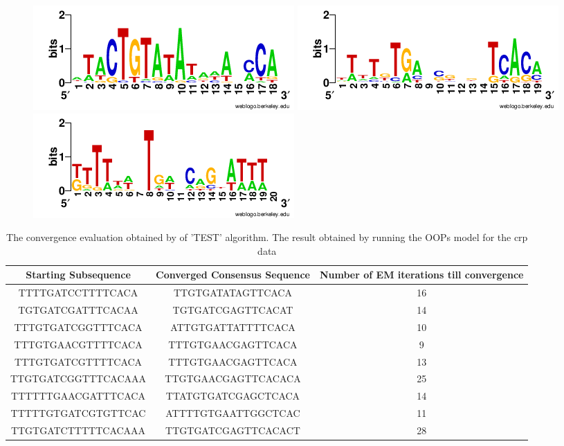\documentclass{article}
\begin{document}
\begin{table}
 \begin{figure}[H]
\centering
\includegraphics[scale=0.45]{crplex1.png}
\includegraphics[scale=0.45]{crplex2.png}
\includegraphics[scale=0.45]{crplex3.png}
\label{fig:svd}
\end{figure}
\end{table}




\begin{table}
\caption{The convergence evaluation obtained by  of 'TEST' algorithm. The result obtained by running the OOPs model for the crp data}
\centering
  \begin{tabular}{|c|c|c|}
    \textbf{Starting Subsequence}     & \textbf{Converged Consensus Sequence} &\textbf{Number of EM iterations till convergence}\\
  \midrule
TTTTGATCCTTTTCACA&TTGTGATATAGTTCACA&16\\

TGTGATCGATTTCACAA&TGTGATCGAGTTCACAT&14\\

TTTGTGATCGGTTTCACA&ATTGTGATTATTTTCACA&10\\

TTTGTGAACGTTTTCACA&TTTGTGAACGAGTTCACA&9\\
TTTGTGATCGTTTTCACA&TTTGTGAACGAGTTCACA&13\\
TTGTGATCGGTTTCACAAA&TTGTGAACGAGTTCACACA&25\\

TTTTTTGAACGATTTCACA&TTATGTGATCGAGCTCACA&14\\
TTTTTGTGATCGTGTTCAC&ATTTTGTGAATTGGCTCAC&11\\
TTGTGATCTTTTTCACAAA&TTGTGATCGAGTTCACACT&28\\
\hline
\end{tabular}
\end{table}
\end{document}
